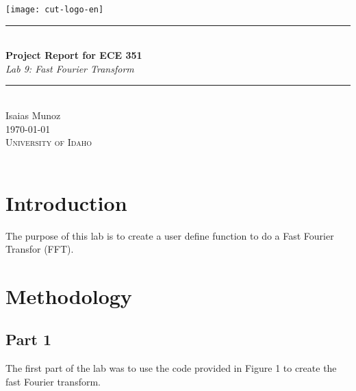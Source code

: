\documentclass[12pt,a4paper]{article}
\newcommand{\HRule}{\rule{\linewidth}{0.5mm}}
\begin{document}
\begin{titlepage}
\begin{center}
\texttt{[image: cut-logo-en]}~\\[2cm]
\HRule \\[0.4cm]
{ \LARGE 
  \textbf{Project Report for ECE 351}\\[0.4cm]
  \emph{Lab 9: Fast Fourier Transform}\\[0.4cm]
}
\HRule \\[1.5cm]
{ \large
  Isaias Munoz  \\[0.1cm]
  \today\\[0.1cm]
}
\vfill
\textsc{\Large University of Idaho}\\
\\
 
\end{center}
\end{titlepage}
\newpage
\tableofcontents
{}
\newpage
\setcounter{page}{1}
\section{Introduction}\label{sec:intro}

The purpose of this lab is to create a user define function to do a Fast Fourier Transfor (FFT). 





\section{Methodology}\label{sec:meth}
\subsection{Part 1}
The first part of the lab was to use the code provided in Figure 1 to create the fast Fourier transform.
\end{document}
